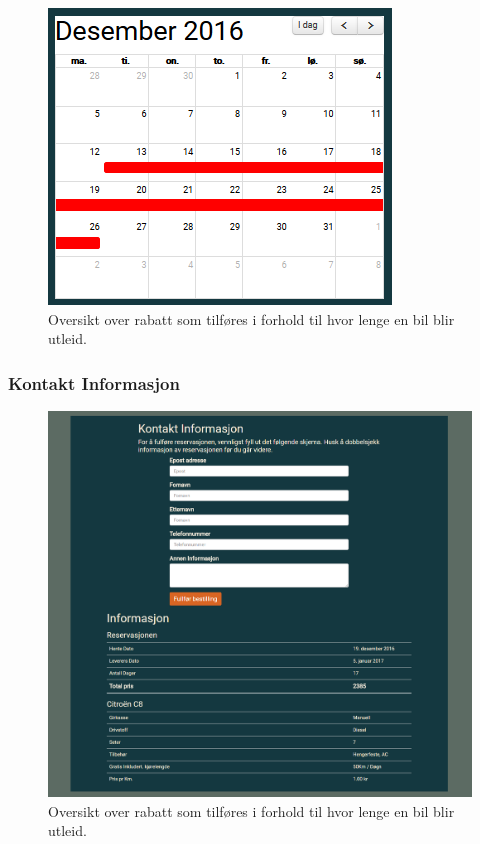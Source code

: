  \begin{figure}[htbp]
	\centering
		\includegraphics[scale=0.3]{Bilder/rv_dateavailable.png}
	\caption[Utleiepris Diagram]{Oversikt over rabatt som tilføres i forhold til hvor lenge en bil blir utleid. } %
	\label{fig:rv_dateavailable}
\end{figure}



\subsubsection{Kontakt Informasjon}
 \begin{figure}[htbp]
	\centering
		\includegraphics[scale=0.3]{Bilder/rv_customercontact.png}
	\caption[Utleiepris Diagram]{Oversikt over rabatt som tilføres i forhold til hvor lenge en bil blir utleid. } %
	\label{fig:rv_customercontact}
\end{figure}

